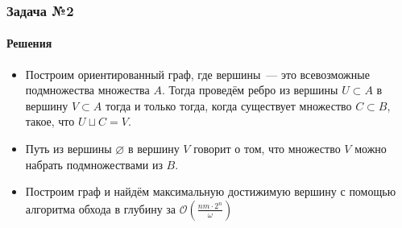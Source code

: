 \documentclass{beamer}
\begin{document}
\begin{frame}
\frametitle{Задача №2}
\framesubtitle{Решения}
\begin{itemize}
	\item Построим ориентированный граф, где вершины~--- это всевозможные подмножества множества $A$. Тогда проведём ребро из вершины $U \subset A$ в вершину $V \subset A$ тогда и только тогда, когда существует множество $C \subset B$, такое, что $U \sqcup C = V$.

	\item Путь из вершины $\varnothing$ в вершину $V$ говорит о том, что множество $V$ можно набрать подмножествами из $B$.

	\item Построим граф и найдём максимальную достижимую вершину с помощью алгоритма обхода в глубину за $\mathcal O\left(\frac{nm\cdot2^n}{\omega}\right)$
\end{itemize}
\end{frame}
\end{document}
